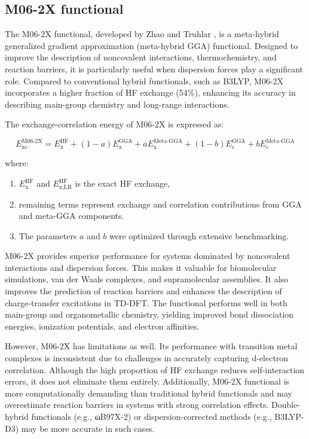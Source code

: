 \subsection{M06-2X functional}

The M06-2X functional, developed by Zhao and Truhlar \cite{Zhao2008}, is a meta-hybrid generalized gradient approximation (meta-hybrid GGA) functional. Designed to improve the description of noncovalent interactions, thermochemistry, and reaction barriers, it is particularly useful when dispersion forces play a significant role. Compared to conventional hybrid functionals, such as B3LYP, M06-2X incorporates a higher fraction of HF exchange (54\%), enhancing its accuracy in describing main-group chemistry and long-range interactions. 

The exchange-correlation energy of M06-2X is expressed as: 

\begin{equation}
    E_{\text{xc}}^{\text{M06-2X}} = E_{\text{x}}^{\text{HF}} + (1 - a) E_{\text{x}}^{\text{GGA}} + a E_{\text{x}}^{\text{Meta-GGA}} + (1 - b) E_{\text{c}}^{\text{GGA}} + b E_{\text{c}}^{\text{Meta-GGA}}
\end{equation}

where:
\begin{enumerate}
  \item $E_{\text{x}}^{\text{HF}}$ and $E_{\text{x,LR}}^{\text{HF}}$ is the exact HF exchange,
  \item remaining terms represent exchange and correlation contributions from GGA and meta-GGA components.
  \item The parameters $a$ and $b$ were optimized through extensive benchmarking.
\end{enumerate}

M06-2X provides superior performance for systems dominated by noncovalent interactions and dispersion forces. This makes it valuable for biomolecular simulations, van der Waals complexes, and supramolecular assemblies. It also improves the prediction of reaction barriers and enhances the description of charge-transfer excitations in TD-DFT. The functional performs well in both main-group and organometallic chemistry, yielding improved bond dissociation energies, ionization potentials, and electron affinities. 

However, M06-2X has limitations as well. Its performance with transition metal complexes is inconsistent due to challenges in accurately capturing d-electron correlation. Although the high proportion of HF exchange reduces self-interaction errors, it does not eliminate them entirely. Additionally, M06-2X functional is more computationally demanding than traditional hybrid functionals and may overestimate reaction barriers in systems with strong correlation effects. Double-hybrid functionals (e.g., ωB97X-2) or dispersion-corrected methods (e.g., B3LYP-D3) may be more  accurate in such cases. 



